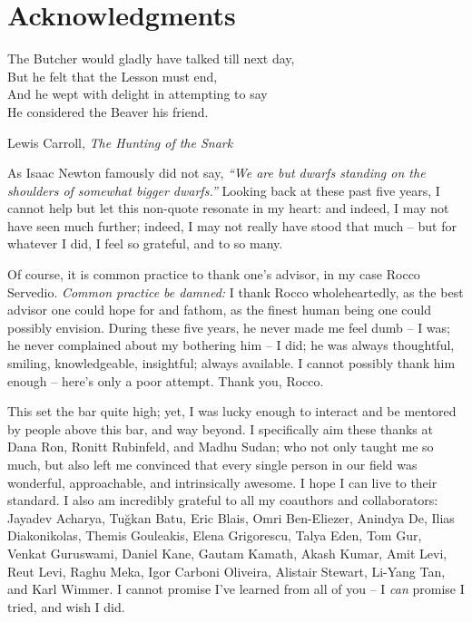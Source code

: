 \cleartorecto %
\chapter{Acknowledgments} %
\thispagestyle{plain} %

\epigraph{The Butcher would gladly have talked till next day,\\
But he felt that the Lesson must end,\\
And he wept with delight in attempting to say\\
He considered the Beaver his friend.}{Lewis Carroll, \textit{The Hunting of the Snark}}

As Isaac Newton famously did not say, \emph{``We are but dwarfs standing on the shoulders of somewhat bigger dwarfs.''} Looking back at these past five years, I cannot help but let this non-quote resonate in my heart: and indeed, I may not have seen much further; indeed, I may not really have stood that much -- but for whatever I did, I feel so grateful, and to so many. 

Of course, it is common practice to thank one's advisor, in my case Rocco Servedio. \emph{Common practice be damned:} I thank Rocco wholeheartedly, as the best advisor one could hope for and fathom, as the finest human being one could possibly envision. During these five years, he never made me feel dumb -- I was; he never complained about my bothering him -- I did; he was always thoughtful, smiling, knowledgeable, insightful; always available. I cannot possibly thank him enough -- here's only a poor attempt. Thank you, Rocco.

This set the bar quite high; yet, I was lucky enough to interact and be mentored by people above this bar, and way beyond. I specifically aim these thanks at Dana Ron, Ronitt Rubinfeld, and Madhu Sudan; who not only taught me so much, but also left me convinced that every single person in our field was wonderful, approachable, and intrinsically awesome. I hope I can live to their standard. I also am incredibly grateful to all my coauthors and collaborators: Jayadev Acharya, Tu\u{g}kan Batu, Eric Blais, Omri Ben-Eliezer, Anindya De, Ilias Diakonikolas, Themis Gouleakis, Elena Grigorescu, Talya Eden, Tom Gur, Venkat Guruswami, Daniel Kane, Gautam Kamath, Akash Kumar, Amit Levi, Reut Levi, Raghu Meka, Igor Carboni Oliveira, Alistair Stewart, Li-Yang Tan, and Karl Wimmer. I cannot promise I've learned from all of you -- I \emph{can} promise I tried, and wish I did.

